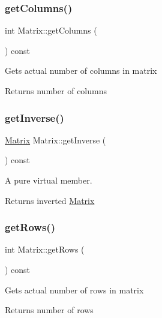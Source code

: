 \subsubsection{\texorpdfstring{get\+Columns()}{getColumns()}}
{\footnotesize\ttfamily int Matrix\+::get\+Columns (\begin{DoxyParamCaption}{ }\end{DoxyParamCaption}) const\hspace{0.3cm}{\ttfamily [inline]}}

Gets actual number of columns in matrix \begin{DoxyReturn}{Returns}
number of columns 
\end{DoxyReturn}
\mbox{\label{classMatrix_ade3fcddb0cc6a7e221a94e13afc7752c}} 
\subsubsection{\texorpdfstring{get\+Inverse()}{getInverse()}}
{\footnotesize\ttfamily \hyperlink{classMatrix}{Matrix} Matrix\+::get\+Inverse (\begin{DoxyParamCaption}{ }\end{DoxyParamCaption}) const}

A pure virtual member. \begin{DoxyReturn}{Returns}
inverted \hyperlink{classMatrix}{Matrix} 
\end{DoxyReturn}
\mbox{\label{classMatrix_ad1b2433d295efcbf371e6f636db757e9}} 
\subsubsection{\texorpdfstring{get\+Rows()}{getRows()}}
{\footnotesize\ttfamily int Matrix\+::get\+Rows (\begin{DoxyParamCaption}{ }\end{DoxyParamCaption}) const\hspace{0.3cm}{\ttfamily [inline]}}

Gets actual number of rows in matrix \begin{DoxyReturn}{Returns}
number of rows 
\end{DoxyReturn}
\mbox{\label{classMatrix_ab752671c6461d950962e151a1af251ce}} 

